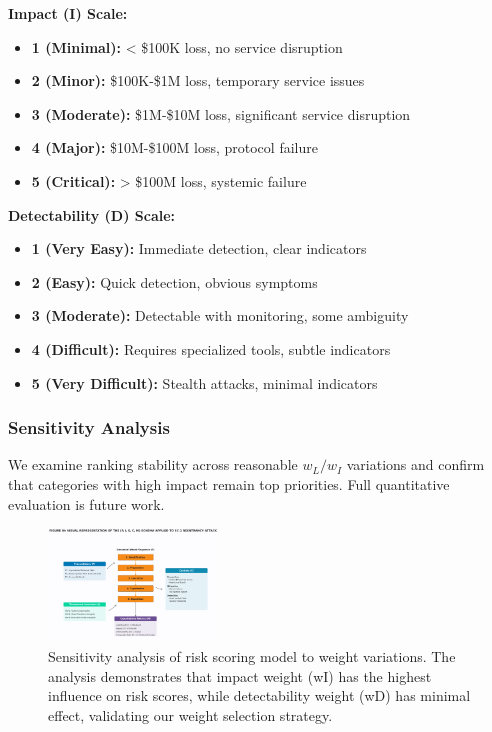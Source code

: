 \textbf{Impact (I) Scale:}
\begin{itemize}
    \item \textbf{1 (Minimal):} < \$100K loss, no service disruption
    \item \textbf{2 (Minor):} \$100K-\$1M loss, temporary service issues
    \item \textbf{3 (Moderate):} \$1M-\$10M loss, significant service disruption
    \item \textbf{4 (Major):} \$10M-\$100M loss, protocol failure
    \item \textbf{5 (Critical):} > \$100M loss, systemic failure
\end{itemize}

\textbf{Detectability (D) Scale:}
\begin{itemize}
    \item \textbf{1 (Very Easy):} Immediate detection, clear indicators
    \item \textbf{2 (Easy):} Quick detection, obvious symptoms
    \item \textbf{3 (Moderate):} Detectable with monitoring, some ambiguity
    \item \textbf{4 (Difficult):} Requires specialized tools, subtle indicators
    \item \textbf{5 (Very Difficult):} Stealth attacks, minimal indicators
\end{itemize}

\subsubsection{Sensitivity Analysis}
We examine ranking stability across reasonable $w_L/w_I$ variations and confirm that categories with high impact remain top priorities. Full quantitative evaluation is future work.

\begin{figure}[H]
\centering
\includegraphics[width=0.4\textwidth]{../figure/fig3.png}
\caption{Sensitivity analysis of risk scoring model to weight variations. The analysis demonstrates that impact weight (wI) has the highest influence on risk scores, while detectability weight (wD) has minimal effect, validating our weight selection strategy.}
\label{fig:sensitivity_analysis}
\end{figure}
